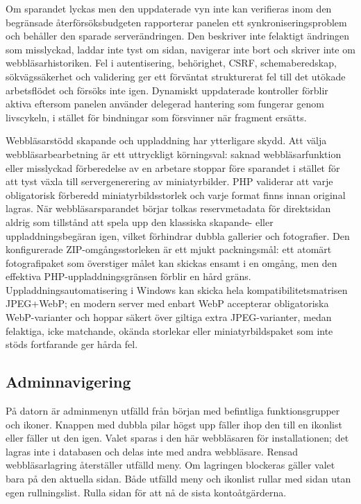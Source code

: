 \documentclass[11pt,a4paper]{article}
\begin{document}
Om sparandet lyckas men den uppdaterade vyn inte kan verifieras inom den
begränsade återförsöksbudgeten rapporterar panelen ett synkroniseringsproblem
och behåller den sparade serverändringen. Den beskriver inte felaktigt ändringen
som misslyckad, laddar inte tyst om sidan, navigerar inte bort och skriver inte
om webbläsarhistoriken. Fel i autentisering, behörighet, CSRF, schemaberedskap,
sökvägssäkerhet och validering ger ett förväntat strukturerat fel till det
utökade arbetsflödet och försöks inte igen. Dynamiskt uppdaterade kontroller
förblir aktiva eftersom panelen använder delegerad hantering som fungerar genom
livscykeln, i stället för bindningar som försvinner när fragment ersätts.

Webbläsarstödd skapande och uppladdning har ytterligare skydd. Att välja
webbläsarbearbetning är ett uttryckligt körningsval: saknad webbläsarfunktion
eller misslyckad förberedelse av en arbetare stoppar före sparandet i stället
för att tyst växla till servergenerering av miniatyrbilder. PHP validerar att
varje obligatorisk förberedd miniatyrbildsstorlek och varje format finns innan
original lagras. När webbläsarsparandet börjar tolkas reservmetadata för
direktsidan aldrig som tillstånd att spela upp den klassiska skapande- eller
uppladdningsbegäran igen, vilket förhindrar dubbla gallerier och fotografier.
Den konfigurerade ZIP-omgångsstorleken är ett mjukt packningsmål: ett atomärt
fotografipaket som överstiger målet kan skickas ensamt i en omgång, men den
effektiva PHP-uppladdningsgränsen förblir en hård gräns.
Uppladdningsautomatisering i Windows kan skicka hela kompatibilitetsmatrisen
JPEG+WebP; en modern server med enbart WebP accepterar obligatoriska
WebP-varianter och hoppar säkert över giltiga extra JPEG-varianter, medan
felaktiga, icke matchande, okända storlekar eller miniatyrbildspaket som inte
stöds fortfarande ger hårda fel.

\subsection{Adminnavigering}

På datorn är adminmenyn utfälld från början med befintliga funktionsgrupper och
ikoner. Knappen med dubbla pilar högst upp fäller ihop den till en ikonlist
eller
fäller ut den igen. Valet sparas i den här webbläsaren för installationen; det
lagras inte i databasen och delas inte med andra webbläsare. Rensad
webbläsarlagring återställer utfälld meny. Om lagringen blockeras gäller valet
bara på den aktuella sidan. Både utfälld meny och ikonlist rullar med sidan
utan egen rullningslist. Rulla sidan för att nå de sista kontoåtgärderna.
\end{document}
